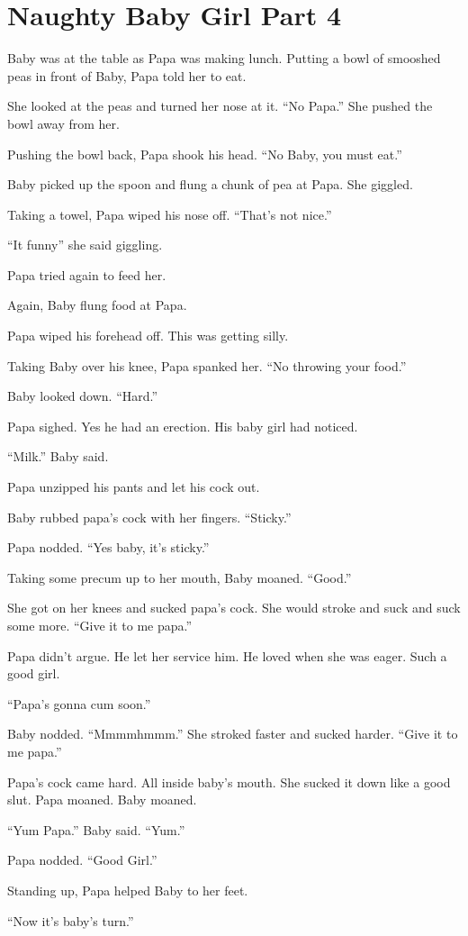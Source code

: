 \section{Naughty Baby Girl Part 4}

     Baby was at the table as Papa was making lunch. Putting a bowl of smooshed peas in front of Baby, Papa told her to eat.

     She looked at the peas and turned her nose at it. “No Papa.” She pushed the bowl away from her.

     Pushing the bowl back, Papa shook his head. “No Baby, you must eat.”

     Baby picked up the spoon and flung a chunk of pea at Papa. She giggled.

     Taking a towel, Papa wiped his nose off. “That’s not nice.”

     “It funny” she said giggling.

     Papa tried again to feed her.

     Again, Baby flung food at Papa.

     Papa wiped his forehead off. This was getting silly.

     Taking Baby over his knee, Papa spanked her. “No throwing your food.”

     Baby looked down. “Hard.”

     Papa sighed. Yes he had an erection. His baby girl had noticed.

     “Milk.” Baby said.

     Papa unzipped his pants and let his cock out.

     Baby rubbed papa’s cock with her fingers. “Sticky.”

     Papa nodded. “Yes baby, it’s sticky.”

     Taking some precum up to her mouth, Baby moaned. “Good.”

     She got on her knees and sucked papa’s cock. She would stroke and suck and suck some more. “Give it to me papa.”

     Papa didn’t argue. He let her service him. He loved when she was eager. Such a good girl.

     “Papa’s gonna cum soon.”

     Baby nodded. “Mmmmhmmm.” She stroked faster and sucked harder. “Give it to me papa.”

     Papa’s cock came hard. All inside baby’s mouth. She sucked it down like a good slut. Papa moaned. Baby moaned.

     “Yum Papa.” Baby said. “Yum.”

     Papa nodded. “Good Girl.”

     Standing up, Papa helped Baby to her feet.

     “Now it’s baby’s turn.”

